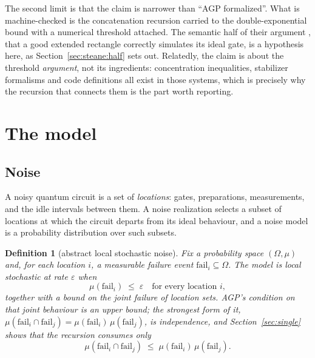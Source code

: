 \documentclass[aps,prx,reprint,nofootinbib,superscriptaddress]{revtex4-2}
\newtheorem{definition}{Definition}
\begin{document}
The second limit is that the claim is narrower than ``AGP formalized''. What is
machine-checked is the concatenation recursion carried to the double-exponential
bound with a numerical threshold attached. The semantic half of their argument
, that a good extended rectangle correctly simulates its ideal gate, is a
hypothesis here, as Section~\ref{sec:steane:half} sets out. Relatedly, the claim
is about the threshold \emph{argument}, not its ingredients:
concentration inequalities, stabilizer formalisms and code definitions all exist
in those systems, which is precisely why the recursion that connects them is the
part worth reporting.

\section{The model}
\label{sec:model}

\subsection{Noise}

A noisy quantum circuit is a set of \emph{locations}: gates, preparations,
measurements, and the idle intervals between them. A noise realization selects a
subset of locations at which the circuit departs from its ideal behaviour, and a
noise model is a probability distribution over such subsets.

\begin{definition}[abstract local stochastic noise]
\label{def:local-stochastic}
Fix a probability space $(\Omega, \mu)$ and, for each location $i$, a measurable
failure event $\mathrm{fail}_i \subseteq \Omega$. The model is \emph{local
stochastic at rate $\varepsilon$} when
\begin{equation}
  \mu(\mathrm{fail}_i) \;\le\; \varepsilon
  \quad\text{for every location } i,
  \label{eq:rate}
\end{equation}
together with a bound on the joint failure of location sets. AGP's condition on
that joint behaviour is an upper bound; the strongest form of it,
$\mu(\mathrm{fail}_i \cap \mathrm{fail}_j) = \mu(\mathrm{fail}_i)\,
\mu(\mathrm{fail}_j)$, is independence, and Section~\ref{sec:single} shows that
the recursion consumes only
\begin{equation}
  \mu(\mathrm{fail}_i \cap \mathrm{fail}_j) \;\le\;
    \mu(\mathrm{fail}_i)\,\mu(\mathrm{fail}_j).
  \label{eq:submul}
\end{equation}
\end{definition}
\end{document}
